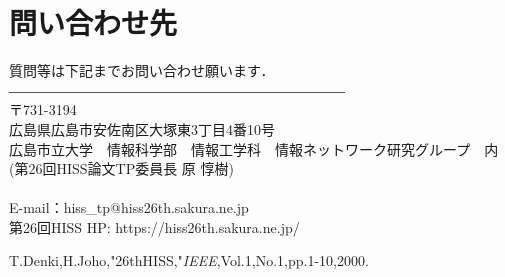 \documentclass[a4j,twocolumn,10pt]{jarticle}
\begin{document}
\section{問い合わせ先}
質問等は下記までお問い合わせ願います．
\\
――――――――――――――――――――――――
\\\small{〒731-3194\\}
\small{広島県広島市安佐南区大塚東3丁目4番10号\\}
\small{広島市立大学　情報科学部　情報工学科　情報ネットワーク研究グループ　内\\} 
\small{(第26回HISS論文TP委員長 原 惇樹)}
\\
\\\small{E-mail：hiss\_tp@hiss26th.sakura.ne.jp}
\\\small{第26回HISS HP: https://hiss26th.sakura.ne.jp/}
\small{}
\\ 
\begin{thebibliography}{9}
T.Denki,H.Joho,"26thHISS,"\textit{IEEE},Vol.1,No.1,pp.1-10,2000.
\end{thebibliography}
\end{document}
